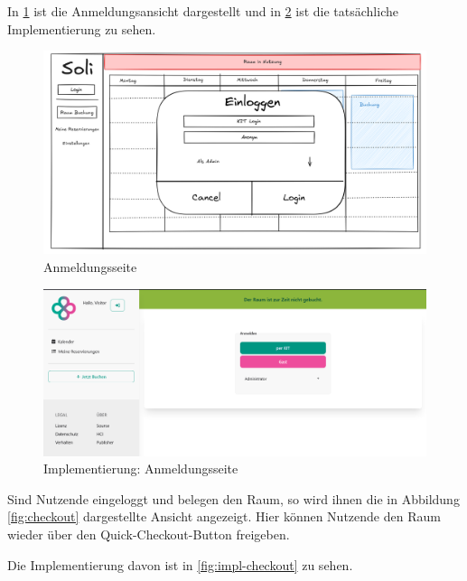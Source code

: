 In \ref{fig:login} ist die Anmeldungsansicht dargestellt und in \ref{fig:impl-login} ist die tatsächliche Implementierung zu sehen.

\begin{figure}[ht]
    \centering
    \includegraphics[width=\textwidth]{figures/mockup/auth_login}
    \caption{Anmeldungsseite}
    \label{fig:login}
\end{figure}
\clearpage

\begin{figure}[ht]
    \centering
    \includegraphics[width=\textwidth]{figures/impl-views/login_light}
    \caption{Implementierung: Anmeldungsseite}
    \label{fig:impl-login}
\end{figure}
\clearpage

Sind Nutzende eingeloggt und belegen den Raum,
so wird ihnen die in Abbildung \ref{fig:checkout} dargestellte Ansicht angezeigt.
Hier können Nutzende den Raum wieder über den Quick-Checkout-Button freigeben.

Die Implementierung davon ist in \ref{fig:impl-checkout} zu sehen.


